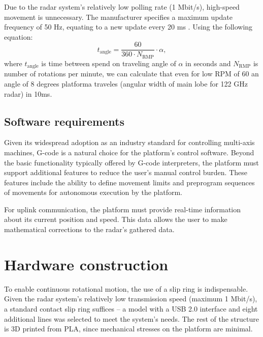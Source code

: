 Due to the radar system's relatively low polling rate (1 Mbit/s), high-speed movement is unnecessary. The manufacturer specifies a maximum update frequency of 50 Hz, equating to a new update every 20 ms \cite{sidarMAN}.
Using the following equation:
%
\begin{equation}
  t_{\mathrm{angle}} = \frac{60}{360\cdot N_{\mathrm{RMP}}} \cdot  \alpha,
  \label{eq:poll}
\end{equation}
%
where $t_{\mathrm{angle}}$ is time between spend on traveling angle of $\alpha $ in seconds and $N_{\mathrm{RMP}}$ is number of rotations per minute, we can calculate that even for low RPM of 60 an angle of 8 degrees platforma traveles (angular width of main lobe for 122 GHz radar) in 10ms.

\section{Software requirements}

Given its widespread adoption as an industry standard for controlling multi-axis machines, G-code is a natural choice for the platform's control software. Beyond the basic functionality typically offered by G-code interpreters, the platform must support additional features to reduce the user's manual control burden. These features include the ability to define movement limits and preprogram sequences of movements for autonomous execution by the platform.

For uplink communication, the platform must provide real-time information about its current position and speed. This data allows the user to make mathematical corrections to the radar's gathered data.




\chapter{Hardware construction}

To enable continuous rotational motion, the use of a slip ring is indispensable. Given the radar system's relatively low transmission speed (maximum 1 Mbit/s), a standard contact slip ring suffices -- a model with a USB 2.0 interface and eight additional lines was selected to meet the system's needs. The rest of the structure is 3D printed from PLA, since mechanical stresses on the platform are minimal.


